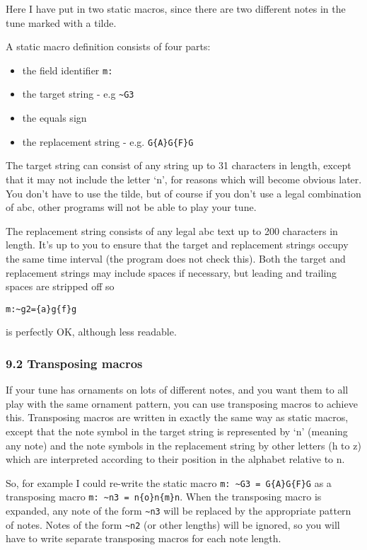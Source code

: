 Here I have put in two static macros, since there are two different
notes in the tune marked with a tilde.

A static macro definition consists of four parts:

\begin{itemize}
\item
  the field identifier \texttt{m:}
\item
  the target string - e.g \texttt{\textasciitilde{}G3}
\item
  the equals sign
\item
  the replacement string - e.g. \texttt{G\{A\}G\{F\}G}
\end{itemize}

The target string can consist of any string up to 31 characters in
length, except that it may not include the letter `n', for reasons which
will become obvious later. You don't have to use the tilde, but of
course if you don't use a legal combination of abc, other programs will
not be able to play your tune.

The replacement string consists of any legal abc text up to 200
characters in length. It's up to you to ensure that the target and
replacement strings occupy the same time interval (the program does not
check this). Both the target and replacement strings may include spaces
if necessary, but leading and trailing spaces are stripped off so

\begin{verbatim}
m:~g2={a}g{f}g
\end{verbatim}

is perfectly OK, although less readable.

\hypertarget{transposing_macros}{\subsubsection{9.2 Transposing
macros}\label{transposing_macros}}

If your tune has ornaments on lots of different notes, and you want them
to all play with the same ornament pattern, you can use transposing
macros to achieve this. Transposing macros are written in exactly the
same way as static macros, except that the note symbol in the target
string is represented by `n' (meaning any note) and the note symbols in
the replacement string by other letters (h to z) which are interpreted
according to their position in the alphabet relative to n.

So, for example I could re-write the static macro
\texttt{m:\ \textasciitilde{}G3\ =\ G\{A\}G\{F\}G} as a transposing
macro \texttt{m:\ \textasciitilde{}n3\ =\ n\{o\}n\{m\}n}. When the
transposing macro is expanded, any note of the form
\texttt{\textasciitilde{}n3} will be replaced by the appropriate pattern
of notes. Notes of the form \texttt{\textasciitilde{}n2} (or other
lengths) will be ignored, so you will have to write separate transposing
macros for each note length.

